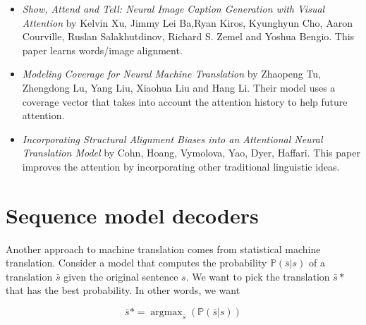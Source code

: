 \documentclass{tufte-handout}
\begin{document}
\begin{itemize}
\item \emph{Show, Attend and Tell: Neural Image Caption Generation with Visual Attention} by Kelvin Xu, Jimmy Lei Ba,Ryan Kiros, Kyunghyun Cho, Aaron Courville, Ruslan Salakhutdinov, Richard S. Zemel and Yoshua Bengio. This paper learns words/image alignment.
\item \emph{Modeling Coverage for Neural Machine Translation} by Zhaopeng Tu, Zhengdong Lu, Yang Liu, Xiaohua Liu and Hang Li. Their model uses a coverage vector that takes into account the attention history to help future attention.
\item \emph{Incorporating Structural Alignment Biases into an Attentional Neural Translation Model} by Cohn, Hoang, Vymolova, Yao, Dyer, Haffari. This paper improves the attention by incorporating other traditional linguistic ideas.
\end{itemize}

\section{Sequence model decoders}
Another approach to machine translation comes from statistical machine translation. Consider a model that computes the probability $ \mathbb{P}(\bar{s} | s) $ of a translation $ \bar{s} $ given the original sentence $ s $. We want to pick the translation $ \bar{s}* $ that has the best probability. In other words, we want

$$ \bar{s}* = \operatorname{argmax}_{\bar{s}}(\mathbb{P}(\bar{s} | s )) $$
\end{document}
